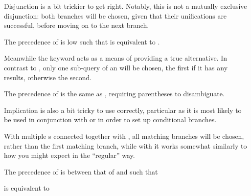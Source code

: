 Disjunction is a bit trickier to get right. Notably, this is not a mutually
exclusive disjunction: both branches will be chosen, given that their unifications
are successful, before moving on to the next branch.

The precedence of  is low such that 
is equivalent to .

\begin{prooftree}
\end{prooftree}

\begin{prooftree}
\end{prooftree}

Meanwhile the  keyword acts as a means of providing a true alternative.
In contrast to , only one sub-query of an  will be chosen, the
first if it has any results, otherwise the second.

The precedence of  is the same as , requiring parentheses to
disambiguate.

\begin{prooftree}
\end{prooftree}

\begin{prooftree}
\end{prooftree}

Implication is also a bit tricky to use correctly, particular as it is most likely
to be used in conjunction with  or  in order to set up conditional
branches.

With multiple s connected together with , all matching branches will
be chosen, rather than the first matching branch, while with  it works
somewhat similarly to how you might expect in the ``regular'' way.

The precedence of  is between that of  and  such that

\begin{center}
\end{center}

is equivalent to

\begin{center}
\end{center}
